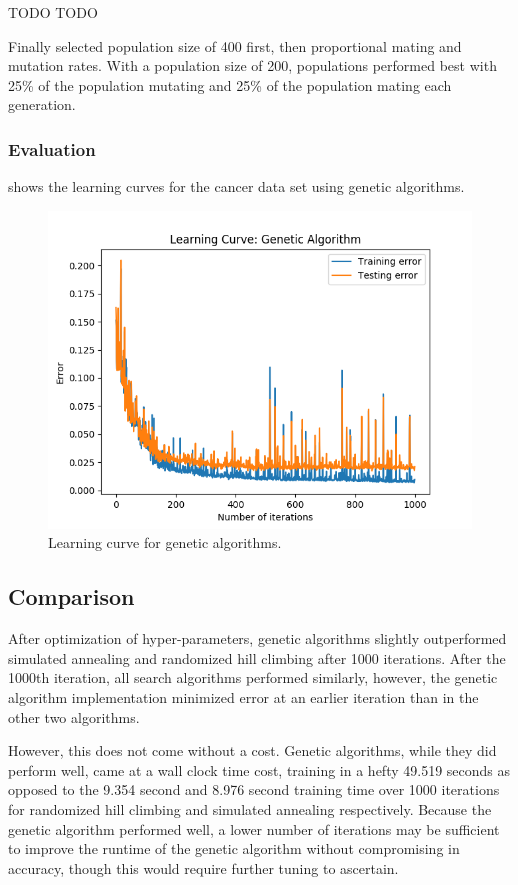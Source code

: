 \documentclass{article}
\begin{document}
        TODO TODO

        Finally selected population size of 400 first, then proportional mating and mutation rates. With a population size of 200, populations performed best with 25\% of the population mutating and 25\% of the population mating each generation.

      \subsubsection{Evaluation}
         shows the learning curves for the cancer data set using genetic algorithms.

        \begin{figure}[htb]
        \centering
        \includegraphics[width=.5\linewidth]{out/plot/GA.png}
        \caption{Learning curve for genetic algorithms.}
        \label{fig:ga-learning}
        \end{figure}

    \subsection{Comparison}
      After optimization of hyper-parameters, genetic algorithms slightly outperformed simulated annealing and randomized hill climbing after 1000 iterations. After the 1000th iteration, all search algorithms performed similarly, however, the genetic algorithm implementation minimized error at an earlier iteration than in the other two algorithms.

      However, this does not come without a cost. Genetic algorithms, while they did perform well, came at a wall clock time cost, training in a hefty 49.519 seconds as opposed to the 9.354 second and 8.976 second training time over 1000 iterations for randomized hill climbing and simulated annealing respectively. Because the genetic algorithm performed well, a lower number of iterations may be sufficient to improve the runtime of the genetic algorithm without compromising in accuracy, though this would require further tuning to ascertain.
\end{document}
